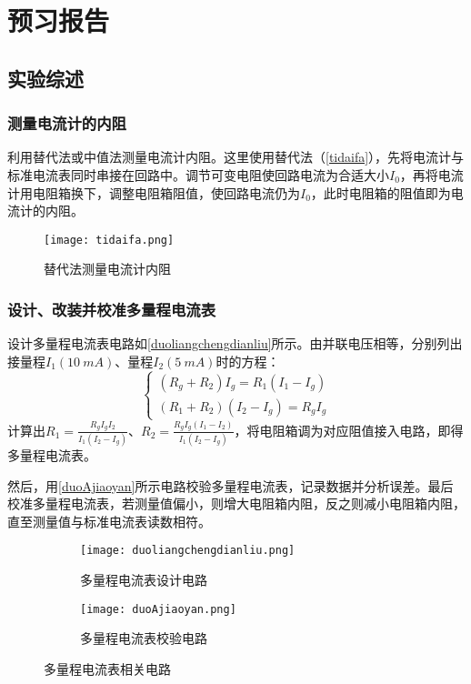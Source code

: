 \documentclass[yuxi]{../template/Preport}
\begin{document}
\makecover

\section{预习报告}
\subsection{实验综述}
\subsubsection{测量电流计的内阻}
    利用替代法或中值法测量电流计内阻。这里使用替代法（\autoref{tidaifa}），先将电流计与标准电流表同时串接在回路中。调节可变电阻使回路电流为合适大小$I_0$，再将电流计用电阻箱换下，调整电阻箱阻值，使回路电流仍为$I_0$，此时电阻箱的阻值即为电流计的内阻。
    \begin{figure}[htbp]
        \centering
        \texttt{[image: tidaifa.png]}
        \caption{替代法测量电流计内阻}
        \label{tidaifa}
    \end{figure}

\subsubsection{设计、改装并校准多量程电流表}
    设计多量程电流表电路如\autoref{duoliangchengdianliu}所示。由并联电压相等，分别列出接量程$I_1(\SI{10}{mA})$、量程$I_2(\SI{5}{mA})$时的方程：
    \begin{equation}
        \begin{cases}
            (R_g+R_2)I_g = R_1 (I_1 - I_g)\\
            (R_1+R_2)(I_2 - I_g) = R_g I_g
        \end{cases}
    \end{equation}
    计算出$R_1 = \frac{R_gI_gI_2}{I_1(I_2-I_g)}$、$R_2 = \frac{R_gI_g(I_1-I_2)}{I_1(I_2-I_g)}$，将电阻箱调为对应阻值接入电路，即得多量程电流表。

    然后，用\autoref{duoAjiaoyan}所示电路校验多量程电流表，记录数据并分析误差。最后校准多量程电流表，若测量值偏小，则增大电阻箱内阻，反之则减小电阻箱内阻，直至测量值与标准电流表读数相符。
    \begin{figure}[htbp]
        \centering
        \begin{subfigure}[b]{0.45\textwidth}
            \texttt{[image: duoliangchengdianliu.png]}
            \caption{多量程电流表设计电路}
            \label{duoliangchengdianliu}
        \end{subfigure}
        \hfill
        \begin{subfigure}[b]{0.45\textwidth}
            \texttt{[image: duoAjiaoyan.png]}
            \caption{多量程电流表校验电路}
            \label{duoAjiaoyan}
        \end{subfigure}
    \caption{多量程电流表相关电路}
    \end{figure}
\end{document}
